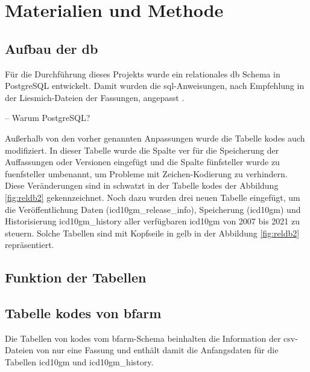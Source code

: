 \chapter{Materialien und Methode} \label{database}

\section{Aufbau der \acs{db}} \label{dbdevelop}

Für die Durchführung dieses Projekts wurde ein relationales \ac{db} Schema in PostgreSQL entwickelt. Damit wurden die \ac{sql}-Anweisungen, nach Empfehlung in der Liesmich-Dateien der Fassungen, angepasst \cite{readmel}. 

-- Warum PostgreSQL?

Außerhalb von den vorher genannten Anpassungen wurde die Tabelle \textsf{kodes} auch modifiziert. In dieser Tabelle wurde die Spalte \textsf{ver} für die Speicherung der Auffassungen oder Versionen eingefügt und die Spalte \textsf{fünfsteller} wurde zu \textsf{fuenfsteller} umbenannt, um Probleme mit Zeichen-Kodierung zu verhindern. Diese Veränderungen sind in schwatzt in der Tabelle \textsf{kodes} der Abbildung \ref{fig:reldb2} gekennzeichnet. Noch dazu wurden drei neuen Tabelle eingefügt, um die Veröffentlichung Daten (\textsf{icd10gm\_release\_info}), Speicherung (\textsf{icd10gm}) und Historisierung \textsf{icd10gm\_history} aller verfügbaren \ac{icd10gm} von 2007 bis 2021 zu steuern. Solche Tabellen sind mit Kopfseile in gelb in der Abbildung \ref{fig:reldb2} repräsentiert.

\section{Funktion der Tabellen}

\section{Tabelle \textsf{kodes} von \acs{bfarm}} \label{bfarmtables}

Die Tabellen von \textsf{kodes} vom \ac{bfarm}-Schema beinhalten die Information der \ac{csv}-Dateien von nur eine Fassung und enthält damit die Anfangsdaten für die Tabellen \textsf{icd10gm} und \textsf{icd10gm\_history}.

